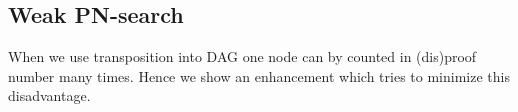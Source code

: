 %
%
%
%
%

\subsection{Weak PN-search}

When we use transposition into DAG one node can by counted in (dis)proof number many times.
Hence we show an enhancement which tries to minimize this disadvantage. 

